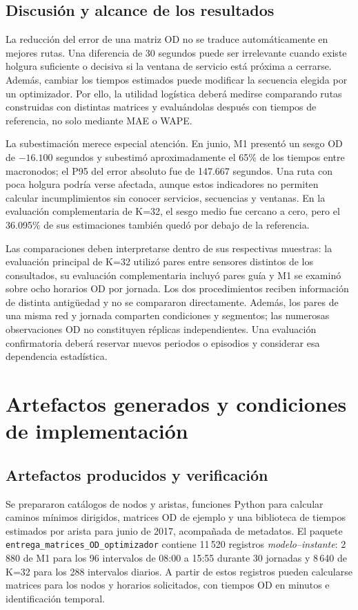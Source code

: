 \documentclass[letterpaper,11pt]{article}
\begin{document}
\subsection{Discusión y alcance de los resultados}
La reducción del error de una matriz OD no se traduce automáticamente en mejores rutas. Una diferencia de 30 segundos puede ser irrelevante cuando existe holgura suficiente o decisiva si la ventana de servicio está próxima a cerrarse. Además, cambiar los tiempos estimados puede modificar la secuencia elegida por un optimizador. Por ello, la utilidad logística deberá medirse comparando rutas construidas con distintas matrices y evaluándolas después con tiempos de referencia, no solo mediante MAE o WAPE.

La subestimación merece especial atención. En junio, M1 presentó un sesgo OD de $-16.100$ segundos y subestimó aproximadamente el 65\% de los tiempos entre macronodos; el P95 del error absoluto fue de 147.667 segundos. Una ruta con poca holgura podría verse afectada, aunque estos indicadores no permiten calcular incumplimientos sin conocer servicios, secuencias y ventanas. En la evaluación complementaria de K=32, el sesgo medio fue cercano a cero, pero el 36.095\% de sus estimaciones también quedó por debajo de la referencia.

Las comparaciones deben interpretarse dentro de sus respectivas muestras: la evaluación principal de K=32 utilizó pares entre sensores distintos de los consultados, su evaluación complementaria incluyó pares guía y M1 se examinó sobre ocho horarios OD por jornada. Los dos procedimientos reciben información de distinta antigüedad y no se compararon directamente. Además, los pares de una misma red y jornada comparten condiciones y segmentos; las numerosas observaciones OD no constituyen réplicas independientes. Una evaluación confirmatoria deberá reservar nuevos periodos o episodios y considerar esa dependencia estadística.

\section{Artefactos generados y condiciones de implementación}

\subsection{Artefactos producidos y verificación}
Se prepararon catálogos de nodos y aristas, funciones Python para calcular caminos mínimos dirigidos, matrices OD de ejemplo y una biblioteca de tiempos estimados por arista para junio de 2017, acompañada de metadatos. El paquete \texttt{entrega\_matrices\_OD\_optimizador} contiene 11\,520 registros \emph{modelo--instante}: 2\,880 de M1 para los 96 intervalos de 08:00 a 15:55 durante 30 jornadas y 8\,640 de K=32 para los 288 intervalos diarios. A partir de estos registros pueden calcularse matrices para los nodos y horarios solicitados, con tiempos OD en minutos e identificación temporal.
\end{document}
